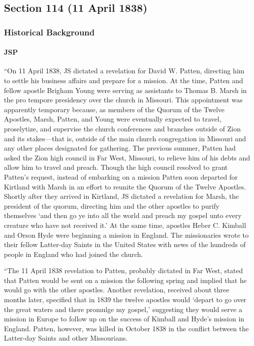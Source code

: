 \subsection{Section 114 (11 April 1838)}
	\label{DC114}
	
	\subsubsection{Historical Background}
		\label{DC114-HB}
		
		\paragraph{JSP}
		
			``On 11 April 1838, JS dictated a revelation for David W. Patten, directing him to settle his business affairs and prepare for a mission. At the time, Patten and fellow apostle Brigham Young were serving as assistants to Thomas B. Marsh in the pro tempore presidency over the church in Missouri. This appointment was apparently temporary because, as members of the Quorum of the Twelve Apostles, Marsh, Patten, and Young were eventually expected to travel, proselytize, and supervise the church conferences and branches outside of Zion and its stakes---that is, outside of the main church congregation in Missouri and any other places designated for gathering. The previous summer, Patten had asked the Zion high council in Far West, Missouri, to relieve him of his debts and allow him to travel and preach. Though the high council resolved to grant Patten's request, instead of embarking on a mission Patten soon departed for Kirtland with Marsh in an effort to reunite the Quorum of the Twelve Apostles. Shortly after they arrived in Kirtland, JS dictated a revelation for Marsh, the president of the quorum, directing him and the other apostles to purify themselves `and then go ye into all the world and preach my gospel unto every creature who have not received it.' At the same time, apostles Heber C. Kimball and Orson Hyde were beginning a mission in England. The missionaries wrote to their fellow Latter-day Saints in the United States with news of the hundreds of people in England who had joined the church.

			``The 11 April 1838 revelation to Patten, probably dictated in Far West, stated that Patten would be sent on a mission the following spring and implied that he would go with the other apostles. Another revelation, received about three months later, specified that in 1839 the twelve apostles would `depart to go over the great waters and there promulge my gospel,' suggesting they would serve a mission in Europe to follow up on the success of Kimball and Hyde's mission in England. Patten, however, was killed in October 1838 in the conflict between the Latter-day Saints and other Missourians.

